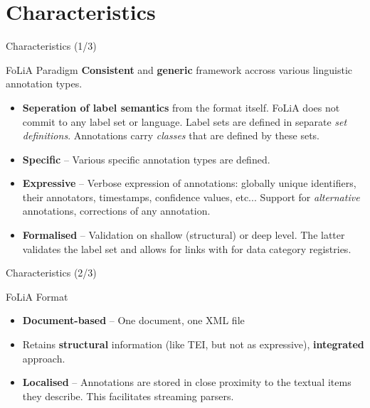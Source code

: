 \documentclass[xcolor=table,10pt,t]{beamer}
\begin{document}
\section{Characteristics}

\begin{frame}{Characteristics (1/3)}
    \begin{block}{FoLiA Paradigm}
        \textbf{Consistent} and \textbf{generic} framework accross various linguistic annotation types.
        \begin{itemize}
            \item \textbf{Seperation of label semantics} from the format itself. FoLiA does not
                commit to any label set or language. Label sets are defined in
                separate \emph{set definitions}. Annotations carry
                \emph{classes} that are defined by these sets.
            \item \textbf{Specific} -- Various specific annotation types are defined.
            \item \textbf{Expressive} -- Verbose expression of annotations:
                globally unique identifiers, their annotators, timestamps, confidence values, etc... Support for
                \emph{alternative} annotations, corrections of any annotation.
            \item \textbf{Formalised} -- Validation on shallow (structural) or
                deep level. The latter validates the label set and allows for
                links with for data category registries.
        \end{itemize}
    \end{block}
\end{frame}

\begin{frame}{Characteristics (2/3)}
    \begin{block}{FoLiA Format}
        \begin{itemize}
            \item \textbf{Document-based} -- One document, one XML file
            \item Retains \textbf{structural} information (like TEI, but not as expressive), \textbf{integrated} approach.
            \item \textbf{Localised} -- Annotations are stored in close proximity to the textual items they describe. This facilitates streaming parsers.
        \end{itemize}
    \end{block}
\end{frame}
\end{document}
